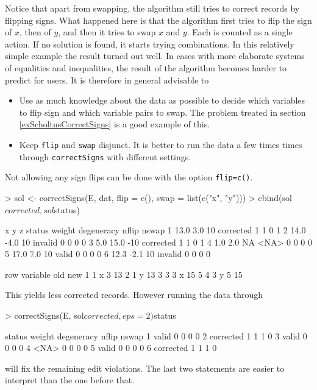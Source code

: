 \documentclass[11pt, fleqn, a4paper]{article}
\begin{document}
Notice that apart from swapping, the algorithm still tries to correct records
by flipping signs.  What happened here is that the algorithm first tries to
flip the sign of $x$, then of $y$, and then it tries to swap $x$ and $y$.  Each
is counted as a single action. If no solution is found, it starts trying
combinations. In this relatively simple example the result turned out well. In
cases with more elaborate systems of equalities and inequalities, the result of
the algorithm becomes harder to predict for users. It is therefore in general
advisable to 
\begin{itemize}
\item Use as much knowledge about the data as possible to decide which
variables to flip sign and which variable pairs to swap.  The problem treated
in section \ref{exScholtusCorrectSigns} is a good example of this.
\item Keep {\tt flip} and {\tt swap} disjunct. It is better to run the data a few times 
        times through {\tt correctSigns} with different settings.
\end{itemize}
Not allowing any sign flips can be done with the option {\tt flip=c()}.
\begin{Schunk}
\begin{Sinput}
> sol <- correctSigns(E, dat, flip = c(), swap = list(c("x", "y")))
> cbind(sol$corrected, sol$status)
\end{Sinput}
\begin{Soutput}
     x    y   z    status weight degeneracy nflip nswap
1 13.0  3.0  10 corrected      1          1     0     1
2 14.0 -4.0  10   invalid      0          0     0     0
3  5.0 15.0 -10 corrected      1          1     0     1
4  1.0  2.0  NA      <NA>      0          0     0     0
5 17.0  7.0  10     valid      0          0     0     0
6 12.3 -2.1  10   invalid      0          0     0     0
\end{Soutput}
\begin{Soutput}
  row variable old new
1   1        x   3  13
2   1        y  13   3
3   3        x  15   5
4   3        y   5  15
\end{Soutput}
\end{Schunk}
This yields less corrected records. However running the data through 
\begin{Schunk}
\begin{Sinput}
> correctSigns(E, sol$corrected, eps = 2)$status
\end{Sinput}
\begin{Soutput}
     status weight degeneracy nflip nswap
1     valid      0          0     0     0
2 corrected      1          1     1     0
3     valid      0          0     0     0
4      <NA>      0          0     0     0
5     valid      0          0     0     0
6 corrected      1          1     1     0
\end{Soutput}
\end{Schunk}
will fix the remaining edit violations. The last two statements are easier to
interpret than the one before that.
\end{document}
